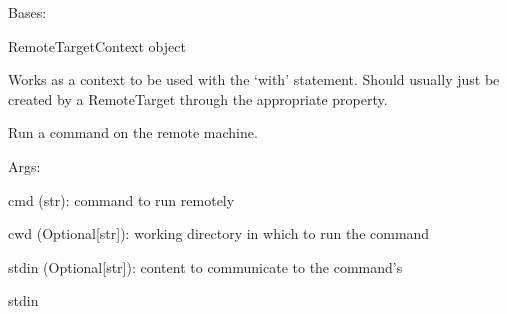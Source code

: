 \documentclass[letterpaper,10pt,english]{sphinxmanual}
\begin{document}

\begin{fulllineitems}
\label{doctree/soprano.hpc.submitter.utils:soprano.hpc.submitter.utils.RemoteTargetContext}
Bases: 

RemoteTargetContext object

Works as a context to be used with the `with' statement. Should usually
just be created by a RemoteTarget through the appropriate property.

\begin{fulllineitems}
\label{doctree/soprano.hpc.submitter.utils:soprano.hpc.submitter.utils.RemoteTargetContext.get_files}
\end{fulllineitems}


\begin{fulllineitems}
\label{doctree/soprano.hpc.submitter.utils:soprano.hpc.submitter.utils.RemoteTargetContext.put_files}
\end{fulllineitems}


\begin{fulllineitems}
\label{doctree/soprano.hpc.submitter.utils:soprano.hpc.submitter.utils.RemoteTargetContext.run_cmd}
Run a command on the remote machine.

\begin{DUlineblock}{0em}
\item[] Args:
\item[]
\begin{DUlineblock}{\DUlineblockindent}
\item[] cmd (str): command to run remotely
\item[] cwd (Optional{[}str{]}): working directory in which to run the command
\item[] stdin (Optional{[}str{]}): content to communicate to the command's
\item[]
\begin{DUlineblock}{\DUlineblockindent}
\item[] stdin
\end{DUlineblock}
\end{DUlineblock}
\end{DUlineblock}


\end{fulllineitems}
\end{fulllineitems}
\end{document}
